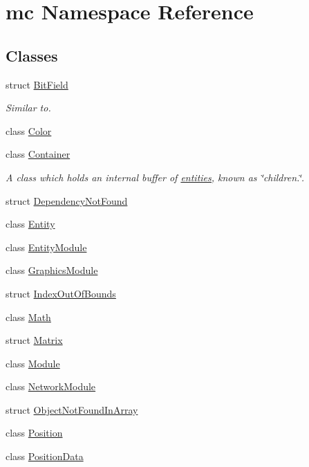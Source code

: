 \hypertarget{namespacemc}{}\section{mc Namespace Reference}
\label{namespacemc}
\subsection*{Classes}
\begin{DoxyCompactItemize}
\item 
struct \hyperlink{structmc_1_1_bit_field}{Bit\+Field}
\begin{DoxyCompactList}\small\item\em Similar to. \end{DoxyCompactList}\item 
class \hyperlink{classmc_1_1_color}{Color}
\item 
class \hyperlink{classmc_1_1_container}{Container}
\begin{DoxyCompactList}\small\item\em A class which holds an internal buffer of \hyperlink{classmc_1_1_entity}{entities,} known as \char`\"{}children.\char`\"{}. \end{DoxyCompactList}\item 
struct \hyperlink{structmc_1_1_dependency_not_found}{Dependency\+Not\+Found}
\item 
class \hyperlink{classmc_1_1_entity}{Entity}
\item 
class \hyperlink{classmc_1_1_entity_module}{Entity\+Module}
\item 
class \hyperlink{classmc_1_1_graphics_module}{Graphics\+Module}
\item 
struct \hyperlink{structmc_1_1_index_out_of_bounds}{Index\+Out\+Of\+Bounds}
\item 
class \hyperlink{classmc_1_1_math}{Math}
\item 
struct \hyperlink{structmc_1_1_matrix}{Matrix}
\item 
class \hyperlink{classmc_1_1_module}{Module}
\item 
class \hyperlink{classmc_1_1_network_module}{Network\+Module}
\item 
struct \hyperlink{structmc_1_1_object_not_found_in_array}{Object\+Not\+Found\+In\+Array}
\item 
class \hyperlink{classmc_1_1_position}{Position}
\item 
class \hyperlink{classmc_1_1_position_data}{Position\+Data}
\item 

\end{DoxyCompactItemize}

